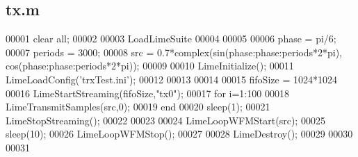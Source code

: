 \subsection{tx.\+m}
\label{tx_8m_source}

\begin{DoxyCode}
00001 clear all;
00002 
00003 LoadLimeSuite
00004 
00005 %
00006 phase = pi/6;           %
00007 periods = 3000;         %
00008 src = 0.7*complex(sin(phase:phase:periods*2*pi), cos(phase:phase:periods*2*pi));
00009 
00010 LimeInitialize();               %
00011 LimeLoadConfig(\textcolor{stringliteral}{'trxTest.ini'});  %
00012                                 %
00013                                 
00014 %
00015 fifoSize = 1024*1024        %
00016 LimeStartStreaming(fifoSize,"tx0"); %
00017 \textcolor{keywordflow}{for} i=1:100
00018     LimeTransmitSamples(src,0); %
00019 end
00020 sleep(1);
00021 LimeStopStreaming();    %
00022 
00023 %
00024 LimeLoopWFMStart(src);  %
00025 sleep(10);
00026 LimeLoopWFMStop();      %
00027 
00028 LimeDestroy();          %
00029 
00030 
00031 
\end{DoxyCode}
